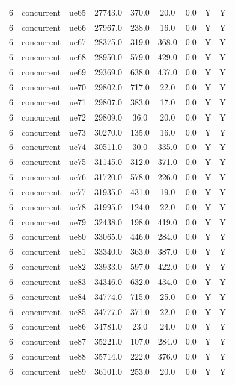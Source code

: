 \begin{table}[ht]
\begin{tabular}{|c|c|c|c|c|c|c|c|c|}
6 & concurrent & ue65 & 27743.0 & 370.0 & 20.0 & 0.0 & Y & Y \\
6 & concurrent & ue66 & 27967.0 & 238.0 & 16.0 & 0.0 & Y & Y \\
6 & concurrent & ue67 & 28375.0 & 319.0 & 368.0 & 0.0 & Y & Y \\
6 & concurrent & ue68 & 28950.0 & 579.0 & 429.0 & 0.0 & Y & Y \\
6 & concurrent & ue69 & 29369.0 & 638.0 & 437.0 & 0.0 & Y & Y \\
6 & concurrent & ue70 & 29802.0 & 717.0 & 22.0 & 0.0 & Y & Y \\
6 & concurrent & ue71 & 29807.0 & 383.0 & 17.0 & 0.0 & Y & Y \\
6 & concurrent & ue72 & 29809.0 & 36.0 & 20.0 & 0.0 & Y & Y \\
6 & concurrent & ue73 & 30270.0 & 135.0 & 16.0 & 0.0 & Y & Y \\
6 & concurrent & ue74 & 30511.0 & 30.0 & 335.0 & 0.0 & Y & Y \\
6 & concurrent & ue75 & 31145.0 & 312.0 & 371.0 & 0.0 & Y & Y \\
6 & concurrent & ue76 & 31720.0 & 578.0 & 226.0 & 0.0 & Y & Y \\
6 & concurrent & ue77 & 31935.0 & 431.0 & 19.0 & 0.0 & Y & Y \\
6 & concurrent & ue78 & 31995.0 & 124.0 & 22.0 & 0.0 & Y & Y \\
6 & concurrent & ue79 & 32438.0 & 198.0 & 419.0 & 0.0 & Y & Y \\
6 & concurrent & ue80 & 33065.0 & 446.0 & 284.0 & 0.0 & Y & Y \\
6 & concurrent & ue81 & 33340.0 & 363.0 & 387.0 & 0.0 & Y & Y \\
6 & concurrent & ue82 & 33933.0 & 597.0 & 422.0 & 0.0 & Y & Y \\
6 & concurrent & ue83 & 34346.0 & 632.0 & 434.0 & 0.0 & Y & Y \\
6 & concurrent & ue84 & 34774.0 & 715.0 & 25.0 & 0.0 & Y & Y \\
6 & concurrent & ue85 & 34777.0 & 371.0 & 22.0 & 0.0 & Y & Y \\
6 & concurrent & ue86 & 34781.0 & 23.0 & 24.0 & 0.0 & Y & Y \\
6 & concurrent & ue87 & 35221.0 & 107.0 & 284.0 & 0.0 & Y & Y \\
6 & concurrent & ue88 & 35714.0 & 222.0 & 376.0 & 0.0 & Y & Y \\
6 & concurrent & ue89 & 36101.0 & 253.0 & 20.0 & 0.0 & Y & Y \\

\end{tabular}
\end{table}

